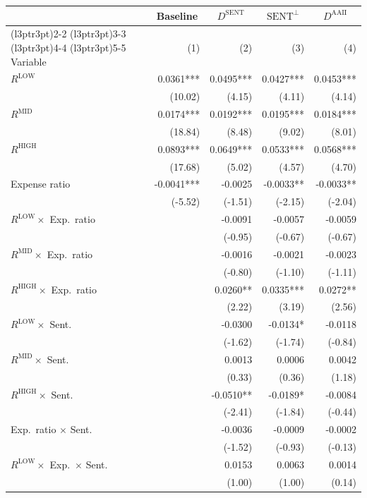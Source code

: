 \begin{table}[!htbp]
{\begin{tabular*}{\linewidth}{@{\extracolsep{\fill}}lrrrr}
\toprule
\multicolumn{1}{c}{ } & \multicolumn{1}{c}{Baseline} & \multicolumn{1}{c}{$D^{\text{SENT}}$} & \multicolumn{1}{c}{$\text{SENT}^\perp$} & \multicolumn{1}{c}{$D^{\text{AAII}}$} \\
\cmidrule(l{3pt}r{3pt}){2-2} \cmidrule(l{3pt}r{3pt}){3-3} \cmidrule(l{3pt}r{3pt}){4-4} \cmidrule(l{3pt}r{3pt}){5-5}
Variable & (1) & (2) & (3) & (4)\\
\midrule
$R^{\text{LOW}}$ & 0.0361*** & 0.0495*** & 0.0427*** & 0.0453***\\
 & (10.02) & (4.15) & (4.11) & (4.14)\\
$R^{\text{MID}}$ & 0.0174*** & 0.0192*** & 0.0195*** & 0.0184***\\
 & (18.84) & (8.48) & (9.02) & (8.01)\\
$R^{\text{HIGH}}$ & 0.0893*** & 0.0649*** & 0.0533*** & 0.0568***\\
 & (17.68) & (5.02) & (4.57) & (4.70)\\
Expense ratio & -0.0041*** & -0.0025 & -0.0033** & -0.0033**\\
 & (-5.52) & (-1.51) & (-2.15) & (-2.04)\\
$R^{\text{LOW}}\times$ Exp.\ ratio &  & -0.0091 & -0.0057 & -0.0059\\
 &  & (-0.95) & (-0.67) & (-0.67)\\
$R^{\text{MID}}\times$ Exp.\ ratio &  & -0.0016 & -0.0021 & -0.0023\\
 &  & (-0.80) & (-1.10) & (-1.11)\\
$R^{\text{HIGH}}\times$ Exp.\ ratio &  & 0.0260** & 0.0335*** & 0.0272**\\
 &  & (2.22) & (3.19) & (2.56)\\
$R^{\text{LOW}}\times$ Sent. &  & -0.0300 & -0.0134* & -0.0118\\
 &  & (-1.62) & (-1.74) & (-0.84)\\
$R^{\text{MID}}\times$ Sent. &  & 0.0013 & 0.0006 & 0.0042\\
 &  & (0.33) & (0.36) & (1.18)\\
$R^{\text{HIGH}}\times$ Sent. &  & -0.0510** & -0.0189* & -0.0084\\
 &  & (-2.41) & (-1.84) & (-0.44)\\
Exp.\ ratio $\times$ Sent. &  & -0.0036 & -0.0009 & -0.0002\\
 &  & (-1.52) & (-0.93) & (-0.13)\\
$R^{\text{LOW}}\times$ Exp.\ $\times$ Sent. &  & 0.0153 & 0.0063 & 0.0014\\
 &  & (1.00) & (1.00) & (0.14)\\

\end{tabular*}}
\end{table}

